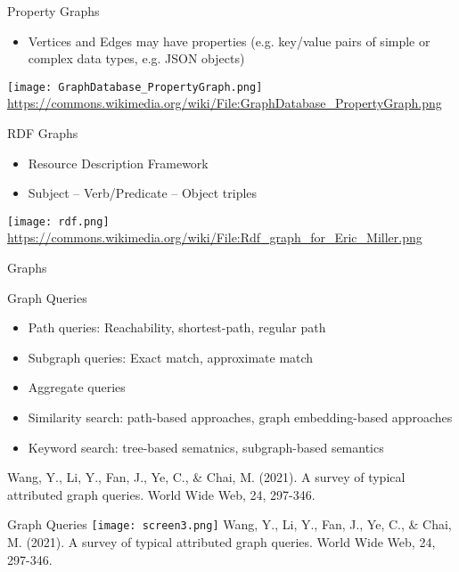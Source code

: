\documentclass[ignorenonframetext,xcolor=x11names]{beamer}
\begin{document}
\begin{frame}{Property Graphs}
\begin{itemize}
	\item Vertices and Edges may have properties (e.g. key/value pairs of simple or complex data types, e.g. JSON objects)
\end{itemize}

\centering
\texttt{[image: GraphDatabase\_PropertyGraph.png]}
\tiny{\url{https://commons.wikimedia.org/wiki/File:GraphDatabase_PropertyGraph.png}}
\end{frame}

\begin{frame}{RDF Graphs}
\begin{itemize}
	\item Resource Description Framework
	\item Subject -- Verb/Predicate -- Object triples
\end{itemize}

\centering
\texttt{[image: rdf.png]}
\tiny{\url{https://commons.wikimedia.org/wiki/File:Rdf_graph_for_Eric_Miller.png}}
\end{frame}

\begin{frame}{Graphs}
\begin{block}{Graph Queries}
\begin{itemize}
	\item Path queries: Reachability, shortest-path, regular path
	\item Subgraph queries: Exact match, approximate match
	\item Aggregate queries
	\item Similarity search: path-based approaches, graph embedding-based approaches
	\item Keyword search: tree-based sematnics, subgraph-based semantics
\end{itemize}
\end{block}
\scriptsize
Wang, Y., Li, Y., Fan, J., Ye, C., \& Chai, M. (2021). A survey of typical attributed graph queries. World Wide Web, 24, 297-346.
\end{frame}

\begin{frame}{Graph Queries}
\texttt{[image: screen3.png]}
\scriptsize
Wang, Y., Li, Y., Fan, J., Ye, C., \& Chai, M. (2021). A survey of typical attributed graph queries. World Wide Web, 24, 297-346.
\end{frame}
\end{document}
